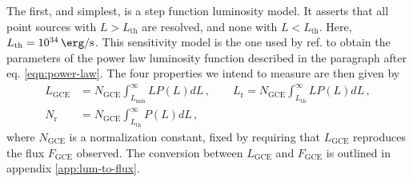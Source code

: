 \documentclass[a4paper,11pt]{article}
\begin{document}
The first, and simplest, is a step function luminosity model. It asserts that all point sources with $L>L_\text{th}$ are resolved, and none with $L<L_{\text{th}}$. Here, $L_\text{th} = \SI{e34}{\erg\per\second}$. This sensitivity model is the one used by ref. \cite{Zhong:2019ycb} to obtain the parameters of the power law luminosity function described in the paragraph after eq. \ref{eqn:power-law}. The four properties we intend to measure are then given by
\begin{equation}
    \begin{split}
        L_\text{GCE} &= N_\text{GCE}\int_{L_\text{min}}^\infty L P(L) dL \,, \qquad
        L_\text{r} = N_\text{GCE}\int_{L_\text{th}}^\infty L P(L) dL \,, \\
        N_\text{r} &= N_\text{GCE}\int_{L_\text{th}}^\infty P(L) dL \,,
        \label{eqn:observables-sens-1}
    \end{split}
\end{equation}
where $N_\text{GCE}$ is a normalization constant, fixed by requiring that $L_\text{GCE}$ reproduces the flux $F_\text{GCE}$ observed. The conversion between $L_\text{GCE}$ and $F_\text{GCE}$ is outlined in appendix \ref{app:lum-to-flux}.
\end{document}
